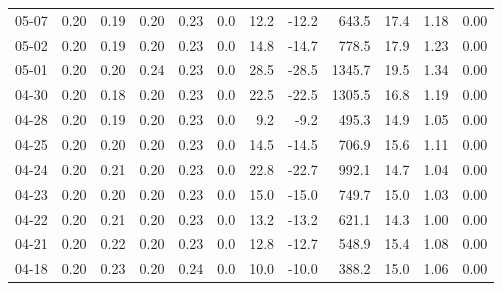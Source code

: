 \begin{threeparttable}
{\begin{tabular}{lrrrrrrrrrrr}
  05-07 &          0.20 &          0.19 &          0.20 &        0.23 &                 0.0 &                12.2 &      -12.2 &               643.5 &             17.4 &            1.18 &                   0.00 \\
  05-02 &          0.20 &          0.19 &          0.20 &        0.23 &                 0.0 &                14.8 &      -14.7 &               778.5 &             17.9 &            1.23 &                   0.00 \\
  05-01 &          0.20 &          0.20 &          0.24 &        0.23 &                 0.0 &                28.5 &      -28.5 &              1345.7 &             19.5 &            1.34 &                   0.00 \\
  04-30 &          0.20 &          0.18 &          0.20 &        0.23 &                 0.0 &                22.5 &      -22.5 &              1305.5 &             16.8 &            1.19 &                   0.00 \\
  04-28 &          0.20 &          0.19 &          0.20 &        0.23 &                 0.0 &                 9.2 &       -9.2 &               495.3 &             14.9 &            1.05 &                   0.00 \\
  04-25 &          0.20 &          0.20 &          0.20 &        0.23 &                 0.0 &                14.5 &      -14.5 &               706.9 &             15.6 &            1.11 &                   0.00 \\
  04-24 &          0.20 &          0.21 &          0.20 &        0.23 &                 0.0 &                22.8 &      -22.7 &               992.1 &             14.7 &            1.04 &                   0.00 \\
  04-23 &          0.20 &          0.20 &          0.20 &        0.23 &                 0.0 &                15.0 &      -15.0 &               749.7 &             15.0 &            1.03 &                   0.00 \\
  04-22 &          0.20 &          0.21 &          0.20 &        0.23 &                 0.0 &                13.2 &      -13.2 &               621.1 &             14.3 &            1.00 &                   0.00 \\
  04-21 &          0.20 &          0.22 &          0.20 &        0.23 &                 0.0 &                12.8 &      -12.7 &               548.9 &             15.4 &            1.08 &                   0.00 \\
  04-18 &          0.20 &          0.23 &          0.20 &        0.24 &                 0.0 &                10.0 &      -10.0 &               388.2 &             15.0 &            1.06 &                   0.00 \\

\end{tabular}}
\end{threeparttable}
